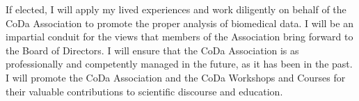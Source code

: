 \documentclass[onecolumn]{article}
\begin{document}
If elected, I will apply my lived experiences and work diligently on
behalf of the CoDa Association to promote the proper analysis of
biomedical data. I will be an impartial conduit for the views that members of the Association bring forward
to the Board of Directors. I will ensure
that the CoDa Association is as professionally and competently managed in
the future, as it has been in the past. I will promote the CoDa
Association and the CoDa Workshops and Courses for their valuable
contributions to scientific discourse and education.
\end{document}

